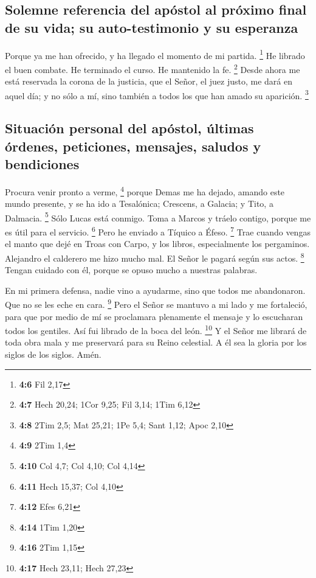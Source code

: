 \hypertarget{solemne-referencia-del-apuxf3stol-al-pruxf3ximo-final-de-su-vida-su-auto-testimonio-y-su-esperanza}{%
\subsection{Solemne referencia del apóstol al próximo final de su vida;
su auto-testimonio y su
esperanza}\label{solemne-referencia-del-apuxf3stol-al-pruxf3ximo-final-de-su-vida-su-auto-testimonio-y-su-esperanza}}

 Porque ya me han ofrecido, y ha llegado el momento de mi
partida. \footnote{\textbf{4:6} Fil 2,17}  He librado el
buen combate. He terminado el curso. He mantenido la fe. \footnote{\textbf{4:7}
  Hech 20,24; 1Cor 9,25; Fil 3,14; 1Tim 6,12}  Desde ahora
me está reservada la corona de la justicia, que el Señor, el juez justo,
me dará en aquel día; y no sólo a mí, sino también a todos los que han
amado su aparición. \footnote{\textbf{4:8} 2Tim 2,5; Mat 25,21; 1Pe 5,4;
  Sant 1,12; Apoc 2,10}

\hypertarget{situaciuxf3n-personal-del-apuxf3stol-uxfaltimas-uxf3rdenes-peticiones-mensajes-saludos-y-bendiciones}{%
\subsection{Situación personal del apóstol, últimas órdenes, peticiones,
mensajes, saludos y
bendiciones}\label{situaciuxf3n-personal-del-apuxf3stol-uxfaltimas-uxf3rdenes-peticiones-mensajes-saludos-y-bendiciones}}

 Procura venir pronto a verme, \footnote{\textbf{4:9} 2Tim
  1,4}  porque Demas me ha dejado, amando este mundo
presente, y se ha ido a Tesalónica; Crescens, a Galacia; y Tito, a
Dalmacia. \footnote{\textbf{4:10} Col 4,7; Col 4,10; Col 4,14}
 Sólo Lucas está conmigo. Toma a Marcos y tráelo contigo,
porque me es útil para el servicio. \footnote{\textbf{4:11} Hech 15,37;
  Col 4,10}  Pero he enviado a Tíquico a Éfeso.
\footnote{\textbf{4:12} Efes 6,21}  Trae cuando vengas el
manto que dejé en Troas con Carpo, y los libros, especialmente los
pergaminos.  Alejandro el calderero me hizo mucho mal. El
Señor le pagará según sus actos. \footnote{\textbf{4:14} 1Tim 1,20}
 Tengan cuidado con él, porque se opuso mucho a nuestras
palabras.

 En mi primera defensa, nadie vino a ayudarme, sino que
todos me abandonaron. Que no se les eche en cara. \footnote{\textbf{4:16}
  2Tim 1,15}  Pero el Señor se mantuvo a mi lado y me
fortaleció, para que por medio de mí se proclamara plenamente el mensaje
y lo escucharan todos los gentiles. Así fui librado de la boca del león.
\footnote{\textbf{4:17} Hech 23,11; Hech 27,23}  Y el
Señor me librará de toda obra mala y me preservará para su Reino
celestial. A él sea la gloria por los siglos de los siglos. Amén.

